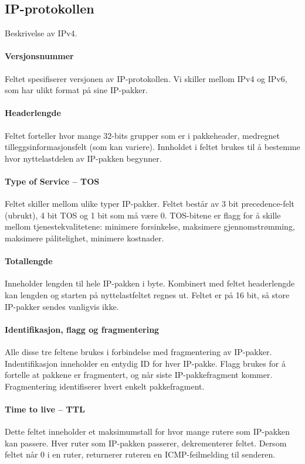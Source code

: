 \documentclass[11pt,a4paper]{article}
\begin{document}
\subsection{IP-protokollen}
Beskrivelse av IPv4.

\paragraph{Versjonsnummer} Feltet spesifiserer versjonen av IP-protokollen. Vi skiller mellom IPv4 og IPv6, som har ulikt format på sine IP-pakker. 
\paragraph{Headerlengde} Feltet forteller hvor mange 32-bits grupper som er i pakkeheader, medregnet tilleggsinformasjonsfelt (som kan variere). Innholdet i feltet brukes til å bestemme hvor nyttelastdelen av IP-pakken begynner.
\paragraph{Type of Service -- TOS} Feltet skiller mellom ulike typer IP-pakker. Feltet består av 3 bit precedence-felt (ubrukt), 4 bit TOS og 1 bit som må være 0. TOS-bitene er flagg for å skille mellom tjenestekvalitetene: minimere forsinkelse, maksimere gjennomstrømming, maksimere pålitelighet, minimere kostnader. 
\paragraph{Totallengde} Inneholder lengden til hele IP-pakken i byte. Kombinert med feltet headerlengde kan lengden og starten på nyttelastfeltet regnes ut. Feltet er på 16 bit, så store IP-pakker sendes vanligvis ikke. 
\paragraph{Identifikasjon, flagg og fragmentering} Alle disse tre feltene brukes i forbindelse med fragmentering av IP-pakker. Indentifikasjon inneholder en entydig ID for hver IP-pakke. Flagg brukes for å fortelle at pakkene er fragmentert, og når siste IP-pakkefragment kommer. Fragmentering identifiserer hvert enkelt pakkefragment.
\paragraph{Time to live -- TTL} Dette feltet inneholder et maksimumstall for hvor mange rutere som IP-pakken kan passere. Hver ruter som IP-pakken passerer, dekrementerer feltet. Dersom feltet når 0 i en ruter, returnerer ruteren en ICMP-feilmelding til senderen.
\end{document}
